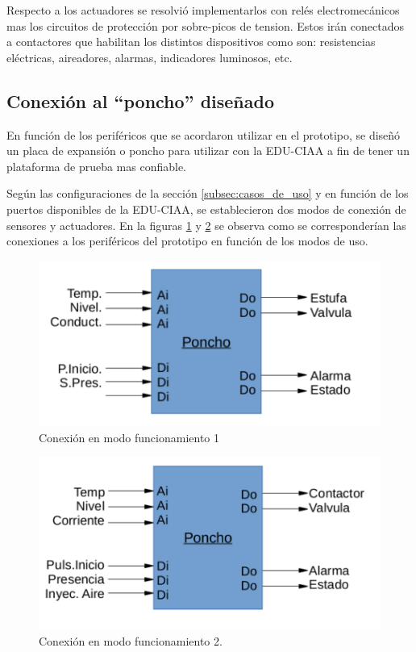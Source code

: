 Respecto a los actuadores se resolvió implementarlos con relés electromecánicos mas los circuitos de protección por sobre-picos de tension. Estos irán conectados a contactores que habilitan los distintos dispositivos como son: resistencias eléctricas, aireadores, alarmas, indicadores luminosos, etc.

\subsection{ Conexión al \enquote{poncho} diseñado }

En función de los periféricos que se acordaron utilizar en el prototipo, se diseñó un placa de expansión o poncho para utilizar con la EDU-CIAA a fin de tener un plataforma de prueba mas confiable. 

Según las configuraciones de la sección \ref{subsec:casos_de_uso} y en función de los puertos disponibles de la EDU-CIAA, se establecieron dos modos de conexión de sensores y actuadores. En la figuras \ref{fig:conectPerifericos1} y \ref{fig:conectPerifericos2} se observa como se corresponderían las conexiones a los periféricos del prototipo en función de los modos de uso. 

\begin{figure}[h!]
	\centering
	\includegraphics[width=.7\textwidth]{Figures/Cap_3/conexion_modo_1}
	\caption{Conexión en modo funcionamiento 1}
	\label{fig:conectPerifericos1}
\end{figure}

\begin{figure}[h!]
	\centering
	\includegraphics[width=.7\textwidth]{Figures/Cap_3/conexion_modo_2}
	\caption{Conexión en modo funcionamiento 2.}
	\label{fig:conectPerifericos2}
\end{figure}

